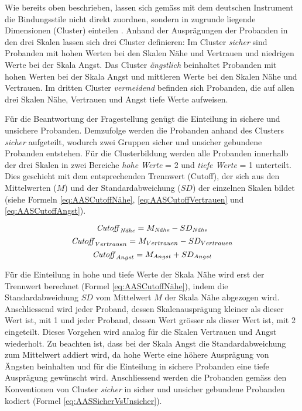 Wie bereits oben beschrieben, lassen sich gemäss  mit dem deutschen Instrument die Bindungsstile nicht direkt zuordnen, sondern in zugrunde liegende Dimensionen (Cluster) einteilen \cite{Schuetzmann2004}. Anhand der Ausprägungen der Probanden in den drei Skalen lassen sich drei Cluster definieren: Im Cluster \textit{sicher} sind Probanden mit hohen Werten bei den Skalen Nähe und Vertrauen und niedrigen Werte bei der Skala Angst. Das Cluster \textit{ängstlich} beinhaltet Probanden mit hohen Werten bei der Skala Angst und mittleren Werte bei den Skalen Nähe und Vertrauen. Im dritten Cluster \textit{vermeidend} befinden sich Probanden, die auf allen drei Skalen Nähe, Vertrauen und Angst tiefe Werte aufweisen.

Für die Beantwortung der Fragestellung genügt die Einteilung in sichere und unsichere Probanden. Demzufolge werden die Probanden anhand des Clusters \textit{sicher} aufgeteilt, wodurch zwei Gruppen sicher und unsicher gebundene Probanden entstehen. 
Für die Clusterbildung werden alle Probanden innerhalb der drei Skalen in zwei Bereiche \textit{hohe Werte} = 2 und \textit{tiefe Werte} = 1 unterteilt. Dies geschieht mit dem entsprechenden Trennwert (Cutoff), der sich aus den Mittelwerten ($M$) und der Standardabweichung ($SD$) der einzelnen Skalen bildet (siehe Formeln \ref{eq:AASCutoffNähe}, \ref{eq:AASCutoffVertrauen} und \ref{eq:AASCutoffAngst}). 

\begin{equation}\label{eq:AASCutoffNähe}
    \text{\textit{Cutoff}}_{\text{\textit{N{\"a}he}}}=M_{\text{\textit{N{\"a}he}}} - SD_{\text{\textit{N{\"a}he}}}
\end{equation}
\begin{equation}\label{eq:AASCutoffVertrauen}
    \text{\textit{Cutoff}}_{Vertrauen}=M_{Vertrauen} - SD_{Vertrauen}
\end{equation}
\begin{equation}\label{eq:AASCutoffAngst}
    \text{\textit{Cutoff}}_{Angst}=M_{Angst} + SD_{Angst}
\end{equation}

Für die Einteilung in hohe und tiefe Werte der Skala Nähe wird erst der Trennwert berechnet (Formel \ref{eq:AASCutoffNähe}), indem die Standardabweichung $SD$ vom Mittelwert $M$ der Skala Nähe abgezogen wird. Anschliessend wird jeder Proband, dessen Skalenausprägung kleiner als dieser Wert ist, mit 1 und jeder Proband, dessen Wert grösser als dieser Wert ist, mit 2 eingeteilt. Dieses Vorgehen wird analog für die Skalen Vertrauen und Angst wiederholt. Zu beachten ist, dass bei der Skala Angst die Standardabweichung zum Mittelwert addiert wird, da hohe Werte eine höhere Ausprägung von Ängsten beinhalten und für die Einteilung in sichere Probanden eine tiefe Ausprägung gewünscht wird. Anschliessend werden die Probanden gemäss den Konventionen von Cluster \textit{sicher} in sicher und unsicher gebundene Probanden kodiert (Formel \ref{eq:AASSicherVsUnsicher}).


